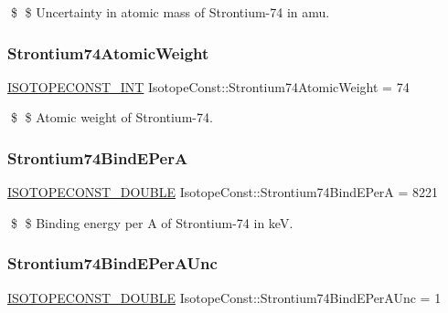 \$ \$ Uncertainty in atomic mass of Strontium-\/74 in amu. \mbox{\label{group___isotope_const-_strontium-_sr74_ga3021c7c208dcd28a430ae1bf9c5748f7}} 
\subsubsection{\texorpdfstring{Strontium74\+Atomic\+Weight}{Strontium74AtomicWeight}}
{\footnotesize\ttfamily \mbox{\hyperlink{group___isotope_const-_macros_ga5f18360b3e99483a35c32d789e62621c}{I\+S\+O\+T\+O\+P\+E\+C\+O\+N\+S\+T\+\_\+\+I\+NT}} Isotope\+Const\+::\+Strontium74\+Atomic\+Weight = 74}

\$ \$ Atomic weight of Strontium-\/74. \mbox{\label{group___isotope_const-_strontium-_sr74_ga7500fd20df8cc9478ff56a2e40dde3fc}} 
\subsubsection{\texorpdfstring{Strontium74\+Bind\+E\+PerA}{Strontium74BindEPerA}}
{\footnotesize\ttfamily \mbox{\hyperlink{group___isotope_const-_macros_ga8f45a7272ce02c0b4c65c44636ed719a}{I\+S\+O\+T\+O\+P\+E\+C\+O\+N\+S\+T\+\_\+\+D\+O\+U\+B\+LE}} Isotope\+Const\+::\+Strontium74\+Bind\+E\+PerA = 8221}

\$ \$ Binding energy per A of Strontium-\/74 in keV. \mbox{\label{group___isotope_const-_strontium-_sr74_ga6b148dc09d3c14af2a4853f53de1b40a}} 
\subsubsection{\texorpdfstring{Strontium74\+Bind\+E\+Per\+A\+Unc}{Strontium74BindEPerAUnc}}
{\footnotesize\ttfamily \mbox{\hyperlink{group___isotope_const-_macros_ga8f45a7272ce02c0b4c65c44636ed719a}{I\+S\+O\+T\+O\+P\+E\+C\+O\+N\+S\+T\+\_\+\+D\+O\+U\+B\+LE}} Isotope\+Const\+::\+Strontium74\+Bind\+E\+Per\+A\+Unc = 1}

